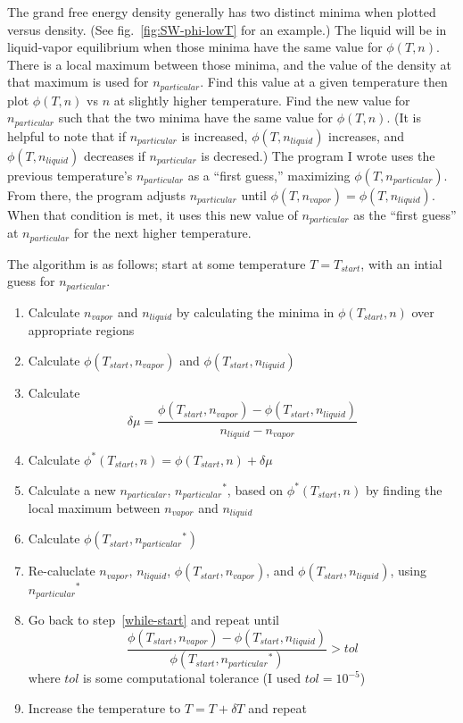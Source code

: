 \documentclass[letterpaper,twocolumn,amsmath,amssymb,prb]{revtex4-1}
\newcommand{\npart}{\ensuremath{n_{particular}}}
\newcommand{\nliq}{\ensuremath{n_{liquid}}}
\newcommand{\nvap}{\ensuremath{n_{vapor}}}
\newcommand{\1}{\ensuremath{\textbf{r}_1}}
\newcommand{\2}{\ensuremath{\textbf{r}_2}}
\begin{document}
The grand free energy density generally has two distinct minima when
plotted versus density. (See fig.~\ref{fig:SW-phi-lowT} for an example.) The liquid will be in liquid-vapor equilibrium
when those minima have the same value for $\phi(T,n)$. There is a local
maximum between those minima, and the value of the density at that
maximum is used for $\npart$. Find this value at a given temperature
then plot $\phi(T,n)$ vs $n$ at slightly higher temperature. Find the new
value for $\npart$ such that the two minima have the same value for
$\phi(T,n)$. (It is helpful to note that if $\npart$ is increased,
$\phi(T,\nliq)$ increases, and $\phi(T,\nliq)$ decreases if $\npart$ is
decresed.) The program I wrote uses the previous
temperature's $\npart$ as a ``first guess,'' maximizing
$\phi(T,\npart)$. From there, the program adjusts $\npart$
until $\phi(T,\nvap) = \phi(T,\nliq)$. When that condition is met, it
uses this new value of $\npart$ as the ``first guess'' at $\npart$ for the next
higher temperature.

The algorithm is as follows; start at some temperature $T=T_{start}$, with an intial guess for $\npart$.
\begin{enumerate}
  \item Calculate $\nvap$ and $\nliq$ by calculating the minima in $\phi(T_{start},n)$ over appropriate regions
  \item Calculate $\phi(T_{start},\nvap)$ and $\phi(T_{start},\nliq)$ \label{while-start}
  \item Calculate \[\delta\mu = \frac{\phi(T_{start},\nvap) - \phi(T_{start},\nliq)}{\nliq - \nvap}\]
  \item Calculate $\phi^*(T_{start},n) = \phi(T_{start},n) + \delta\mu$
  \item Calculate a new $\npart$, $\npart^*$, based on $\phi^*(T_{start},n)$ by finding the local maximum between $\nvap$ and $\nliq$
  \item Calculate $\phi(T_{start},\npart^*)$
  \item Re-caluclate $\nvap$, $\nliq$, $\phi(T_{start},\nvap)$, and $\phi(T_{start},\nliq)$, using $\npart^*$
  \item Go back to step~\ref{while-start} and repeat until \[ \frac{\phi(T_{start},\nvap) - \phi(T_{start},\nliq)}{\phi(T_{start},\npart^*)} > tol  \] where $tol$ is some computational tolerance (I used $tol=10^{-5}$)
  \item Increase the temperature to $T = T + \delta T$ and repeat
\end{enumerate}
\end{document}
